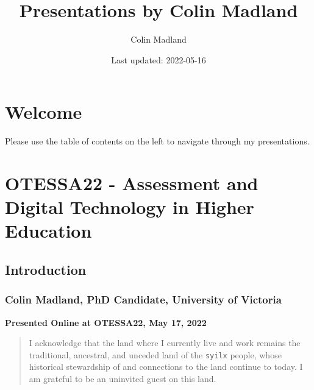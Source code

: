 \documentclass[
]{book}
\title{Presentations by Colin Madland}
\author{Colin Madland}
\date{Last updated: 2022-05-16}
\begin{document}
\maketitle

{
\setcounter{tocdepth}{1}
\tableofcontents
}
\hypertarget{welcome}{%
\chapter*{Welcome}\label{welcome}}

Please use the table of contents on the left to navigate through my presentations.

\hypertarget{otessa22---assessment-and-digital-technology-in-higher-education}{%
\chapter*{OTESSA22 - Assessment and Digital Technology in Higher Education}\label{otessa22---assessment-and-digital-technology-in-higher-education}}

\hypertarget{introduction}{%
\section*{Introduction}\label{introduction}}

\hypertarget{colin-madland-phd-candidate-university-of-victoria}{%
\subsection*{Colin Madland, PhD Candidate, University of Victoria}\label{colin-madland-phd-candidate-university-of-victoria}}

\textbf{Presented Online at OTESSA22, May 17, 2022}

\begin{quote}
I acknowledge that the land where I currently live and work remains the traditional, ancestral, and unceded land of the \texttt{syilx} people, whose historical stewardship of and connections to the land continue to today. I am grateful to be an uninvited guest on this land.
\end{quote}
\end{document}
